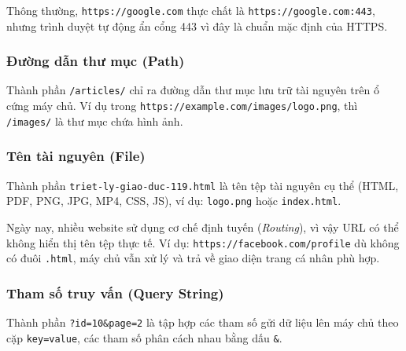\documentclass[11pt,oneside]{book}
\newcommand{\thd}[1]{\textcolor{white}{\textbf{\strut #1}}}
\newcommand{\codeinline}[1]{\textcolor{accentOrange}{\texttt{#1}}}
\begin{document}
\begin{prettyTableBox}
\end{prettyTableBox}

Thông thường, \codeinline{https://google.com} thực chất là \codeinline{https://google.com:443}, nhưng trình duyệt tự động ẩn cổng 443 vì đây là chuẩn mặc định của HTTPS.

\subsubsection{Đường dẫn thư mục (Path)}
Thành phần \codeinline{/articles/} chỉ ra đường dẫn thư mục lưu trữ tài nguyên trên ổ cứng máy chủ. Ví dụ trong \codeinline{https://example.com/images/logo.png}, thì \codeinline{/images/} là thư mục chứa hình ảnh.

\subsubsection{Tên tài nguyên (File)}
Thành phần \codeinline{triet-ly-giao-duc-119.html} là tên tệp tài nguyên cụ thể (HTML, PDF, PNG, JPG, MP4, CSS, JS), ví dụ: \codeinline{logo.png} hoặc \codeinline{index.html}.

\begin{noteBox}
Ngày nay, nhiều website sử dụng cơ chế định tuyến (\textit{Routing}), vì vậy URL có thể không hiển thị tên tệp thực tế. Ví dụ: \codeinline{https://facebook.com/profile} dù không có đuôi \codeinline{.html}, máy chủ vẫn xử lý và trả về giao diện trang cá nhân phù hợp.
\end{noteBox}

\subsubsection{Tham số truy vấn (Query String)}
Thành phần \codeinline{?id=10\&page=2} là tập hợp các tham số gửi dữ liệu lên máy chủ theo cặp \codeinline{key=value}, các tham số phân cách nhau bằng dấu \codeinline{\&}.
\end{document}
